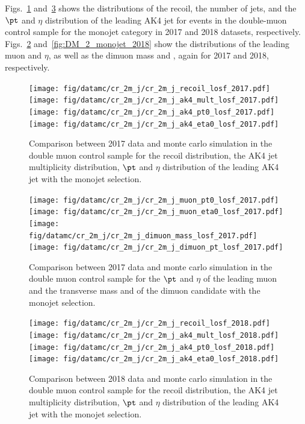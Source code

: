 {Figs.~\ref{fig:DM_monojet_2017} and~\ref{fig:DM_monojet_2018} shows the distributions of the recoil, the number of jets, and the $\pt$ and $\eta$ distribution of the leading AK4  jet
for events in the double-muon control sample for the monojet category in 2017 and 2018 datasets, respectively. Figs.~\ref{fig:DM_2_monojet_2017} and~\ref{fig:DM_2_monojet_2018} show the distributions of the leading muon \pt and $\eta$, as well as the dimuon mass and \pt, again for 2017 and 2018, respectively.

\begin{figure}[htbp]
    \begin{center}
        \texttt{[image: fig/datamc/cr\_2m\_j/cr\_2m\_j\_recoil\_losf\_2017.pdf]}
        \texttt{[image: fig/datamc/cr\_2m\_j/cr\_2m\_j\_ak4\_mult\_losf\_2017.pdf]} \\
        \texttt{[image: fig/datamc/cr\_2m\_j/cr\_2m\_j\_ak4\_pt0\_losf\_2017.pdf]}
        \texttt{[image: fig/datamc/cr\_2m\_j/cr\_2m\_j\_ak4\_eta0\_losf\_2017.pdf]}
    \end{center}
    \caption{Comparison between 2017 data and monte carlo simulation in the double muon control sample for
        the recoil distribution, the AK4 jet multiplicity distribution,  $\pt$ and $\eta$ distribution
        of the leading AK4  jet with the monojet selection.}
    \label{fig:DM_monojet_2017}
\end{figure}

\begin{figure}[htbp]
    \begin{center}
        \texttt{[image: fig/datamc/cr\_2m\_j/cr\_2m\_j\_muon\_pt0\_losf\_2017.pdf]}
        \texttt{[image: fig/datamc/cr\_2m\_j/cr\_2m\_j\_muon\_eta0\_losf\_2017.pdf]} \\
        \texttt{[image: fig/datamc/cr\_2m\_j/cr\_2m\_j\_dimuon\_mass\_losf\_2017.pdf]}
        \texttt{[image: fig/datamc/cr\_2m\_j/cr\_2m\_j\_dimuon\_pt\_losf\_2017.pdf]}
    \end{center}
    \caption{Comparison between 2017 data and monte carlo simulation in the double muon control sample for
        the $\pt$ and $\eta$ of the leading muon and the transverse mass and \pt of the dimuon candidate with the monojet selection.}
    \label{fig:DM_2_monojet_2017}
\end{figure}

\begin{figure}[htbp]
    \begin{center}
        \texttt{[image: fig/datamc/cr\_2m\_j/cr\_2m\_j\_recoil\_losf\_2018.pdf]}
        \texttt{[image: fig/datamc/cr\_2m\_j/cr\_2m\_j\_ak4\_mult\_losf\_2018.pdf]} \\
        \texttt{[image: fig/datamc/cr\_2m\_j/cr\_2m\_j\_ak4\_pt0\_losf\_2018.pdf]}
        \texttt{[image: fig/datamc/cr\_2m\_j/cr\_2m\_j\_ak4\_eta0\_losf\_2018.pdf]}
    \end{center}
    \caption{Comparison between 2018 data and monte carlo simulation in the double muon control sample for
        the recoil distribution, the AK4 jet multiplicity distribution,  $\pt$ and $\eta$ distribution
        of the leading AK4  jet with the monojet selection.}
    \label{fig:DM_monojet_2018}
\end{figure}

}
